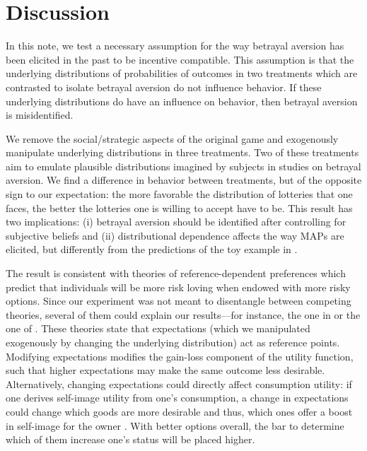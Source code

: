 \section{Discussion}\label{sec:discussion}
In this note, we test a necessary assumption for the way betrayal aversion has been elicited in the past to be incentive compatible.
This assumption is that the underlying distributions of probabilities of outcomes in two treatments which are contrasted to isolate betrayal aversion do not influence behavior.
If these underlying distributions do have an influence on behavior, then betrayal aversion is misidentified.

We remove the social/strategic aspects of the original game and exogenously manipulate underlying distributions in three treatments.
Two of these treatments aim to emulate plausible distributions imagined by subjects in studies on betrayal aversion.
%
We find a difference in behavior between treatments, but of the opposite sign to our expectation: the more favorable the distribution of lotteries that one faces, the better the lotteries one is willing to accept have to be.
This result has two implications: (i) betrayal aversion should be identified after controlling for subjective beliefs and (ii) distributional dependence affects the way MAPs are elicited, but differently from the predictions of the toy example in \cite{Li2020a}.

The result is consistent with theories of reference-dependent preferences which predict that individuals will be more risk loving when endowed with more risky options.
Since our experiment was not meant to disentangle between competing theories, several of them could explain our results---for instance, the one in \cite{Koszegi2006,Koszegi2007} or the one of \cite{Wenner2015}.
These theories state that expectations (which we manipulated exogenously by changing the underlying distribution) act as reference points.
Modifying expectations modifies the gain-loss component of the utility function, such that higher expectations may make the same outcome less desirable.
Alternatively, changing expectations could directly affect consumption utility: if one derives self-image utility from one's consumption, a change in expectations could change which goods are more desirable and thus, which ones offer a boost in self-image for the owner \citep{Strahilevitz1998,Marzilli2011}.
With better options overall, the bar to determine which of them increase one's status will be placed higher.

